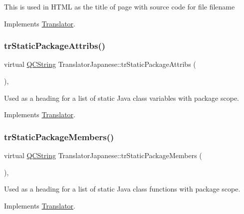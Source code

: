 This is used in H\+T\+ML as the title of page with source code for file filename 

Implements \mbox{\hyperlink{class_translator}{Translator}}.

\mbox{\label{class_translator_japanese_adc6184c3384caa35775d1ac26cd56f51}} 
\subsubsection{\texorpdfstring{trStaticPackageAttribs()}{trStaticPackageAttribs()}}
{\footnotesize\ttfamily virtual \mbox{\hyperlink{class_q_c_string}{Q\+C\+String}} Translator\+Japanese\+::tr\+Static\+Package\+Attribs (\begin{DoxyParamCaption}{ }\end{DoxyParamCaption})\hspace{0.3cm}{\ttfamily [inline]}, {\ttfamily [virtual]}}

Used as a heading for a list of static Java class variables with package scope. 

Implements \mbox{\hyperlink{class_translator}{Translator}}.

\mbox{\label{class_translator_japanese_a033a9b24fc7cbfa2f8c9bb0ebe70d684}} 
\subsubsection{\texorpdfstring{trStaticPackageMembers()}{trStaticPackageMembers()}}
{\footnotesize\ttfamily virtual \mbox{\hyperlink{class_q_c_string}{Q\+C\+String}} Translator\+Japanese\+::tr\+Static\+Package\+Members (\begin{DoxyParamCaption}{ }\end{DoxyParamCaption})\hspace{0.3cm}{\ttfamily [inline]}, {\ttfamily [virtual]}}

Used as a heading for a list of static Java class functions with package scope. 

Implements \mbox{\hyperlink{class_translator}{Translator}}.

